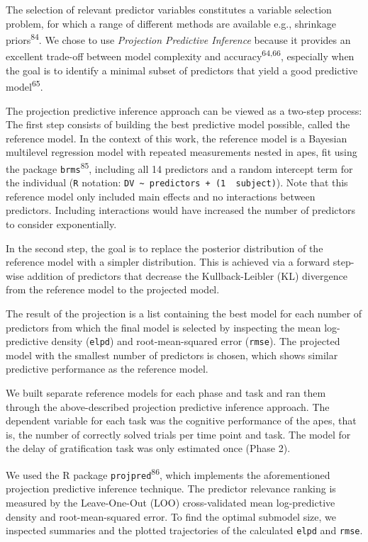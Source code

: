 \documentclass[
  man,floatsintext]{apa6}
\begin{document}
The selection of relevant predictor variables constitutes a variable selection problem, for which a range of different methods are available e.g., shrinkage priors\textsuperscript{84}. We chose to use \emph{Projection Predictive Inference} because it provides an excellent trade-off between model complexity and accuracy\textsuperscript{64,66}, especially when the goal is to identify a minimal subset of predictors that yield a good predictive model\textsuperscript{65}.

The projection predictive inference approach can be viewed as a two-step process: The first step consists of building the best predictive model possible, called the reference model. In the context of this work, the reference model is a Bayesian multilevel regression model with repeated measurements nested in apes, fit using the package \texttt{brms}\textsuperscript{85}, including all 14 predictors and a random intercept term for the individual (\texttt{R} notation: \texttt{DV\ \textasciitilde{}\ predictors\ +\ (1\ \textbar{}\ subject)}). Note that this reference model only included main effects and no interactions between predictors. Including interactions would have increased the number of predictors to consider exponentially.

In the second step, the goal is to replace the posterior distribution of the reference model with a simpler distribution. This is achieved via a forward step-wise addition of predictors that decrease the Kullback-Leibler (KL) divergence from the reference model to the projected model.

The result of the projection is a list containing the best model for each number of predictors from which the final model is selected by inspecting the mean log-predictive density (\texttt{elpd}) and root-mean-squared error (\texttt{rmse}). The projected model with the smallest number of predictors is chosen, which shows similar predictive performance as the reference model.

We built separate reference models for each phase and task and ran them through the above-described projection predictive inference approach. The dependent variable for each task was the cognitive performance of the apes, that is, the number of correctly solved trials per time point and task. The model for the delay of gratification task was only estimated once (Phase 2).

We used the R package \texttt{projpred}\textsuperscript{86}, which implements the aforementioned projection predictive inference technique. The predictor relevance ranking is measured by the Leave-One-Out (LOO) cross-validated mean log-predictive density and root-mean-squared error. To find the optimal submodel size, we inspected summaries and the plotted trajectories of the calculated \texttt{elpd} and \texttt{rmse}.
\end{document}
